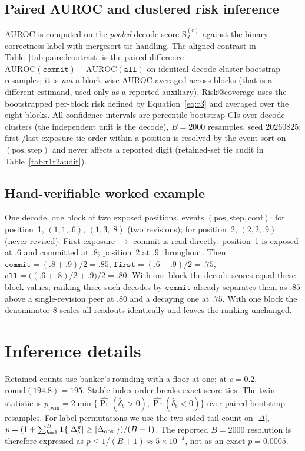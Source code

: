 \documentclass{article}
\begin{document}
\subsection{Paired AUROC and clustered risk inference}
\label{app:readouts:inference}

AUROC is computed on the \emph{pooled} decode score $\mathrm{S}^{(r)}_d$ against the binary
correctness label with mergesort tie handling.  The aligned contrast in
Table~\ref{tab:pairedcontrast} is the paired difference
$\mathrm{AUROC}(\texttt{commit})-\mathrm{AUROC}(\texttt{all})$ on identical decode-cluster
bootstrap resamples; it is \emph{not} a block-wise AUROC averaged across blocks (that is a
different estimand, used only as a reported auxiliary).  Risk@coverage uses the bootstrapped
per-block risk defined by Equation~\ref{eq:r3} and averaged over the eight blocks.  All
confidence intervals are percentile bootstrap CIs over decode clusters (the independent unit is
the decode), $B=2000$ resamples, seed $20260825$; first-/last-exposure tie order within a
position is resolved by the event sort on $(\mathrm{pos},\mathrm{step})$ and never affects a
reported digit (retained-set tie audit in Table~\ref{tab:r1r2audit}).

\subsection{Hand-verifiable worked example}
\label{app:readouts:example}

One decode, one block of two exposed positions, events $(\mathrm{pos},\mathrm{step},\mathrm{conf})$:
for position~1, $(1,1,.6)$, $(1,3,.8)$ (two revisions); for position~2, $(2,2,.9)$ (never revised).
First exposure $\rightarrow$ commit is read directly: position~1 is exposed at $.6$ and committed
at $.8$; position~2 at $.9$ throughout.  Then $\texttt{commit}=(.8+.9)/2=.85$,
$\texttt{first}=(.6+.9)/2=.75$, $\texttt{all}=\big((.6+.8)/2+.9\big)/2=.80$.  With one block the
decode scores equal these block values; ranking three such decodes by $\texttt{commit}$ already
separates them as $.85$ above a single-revision peer at $.80$ and a decaying one at $.75$.
With one block the denominator $8$ scales all readouts identically and leaves the ranking unchanged.

\section{Inference details}
\label{app:inference}

Retained counts use banker's rounding with a floor at one; at $c=0.2$,
$\mathrm{round}(194.8)=195$.  Stable index order breaks exact score ties.  The twin statistic is
$p_{\mathrm{twin}}=2\min\{\widehat{\Pr}(\hat\delta_b>0),
\widehat{\Pr}(\hat\delta_b<0)\}$ over paired bootstrap resamples.  For label permutations we
use the two-sided tail count on $|\Delta|$,
$p=(1+\sum_{b=1}^{B}\mathbf{1}\{|\Delta_b^{\pi}|\ge|\Delta_{\rm obs}|\})/(B+1)$.
The reported $B=2000$ resolution is therefore expressed as
$p\le1/(B+1)\approx5\times10^{-4}$, not as an exact $p=0.0005$.
\end{document}
